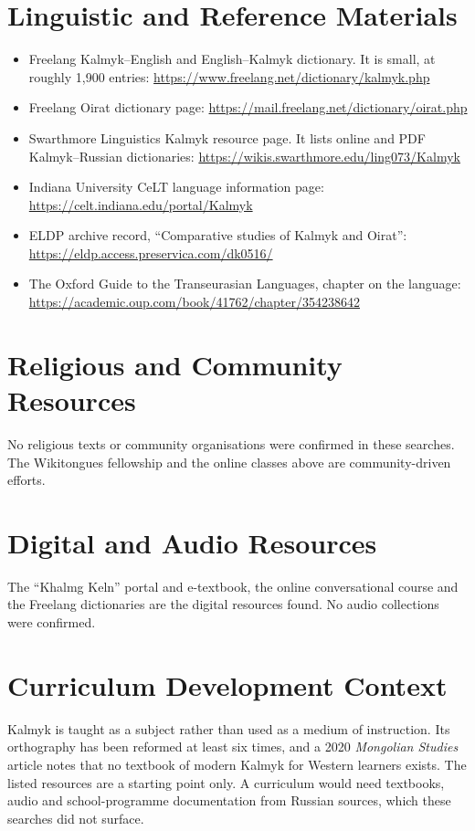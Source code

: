 \documentclass[12pt]{article}
\begin{document}
\section{Linguistic and Reference Materials}
\begin{itemize}
\item Freelang Kalmyk--English and English--Kalmyk dictionary. It is small, at roughly 1,900 entries: \url{https://www.freelang.net/dictionary/kalmyk.php}
\item Freelang Oirat dictionary page: \url{https://mail.freelang.net/dictionary/oirat.php}
\item Swarthmore Linguistics Kalmyk resource page. It lists online and PDF Kalmyk--Russian dictionaries: \url{https://wikis.swarthmore.edu/ling073/Kalmyk}
\item Indiana University CeLT language information page: \url{https://celt.indiana.edu/portal/Kalmyk}
\item ELDP archive record, ``Comparative studies of Kalmyk and Oirat'': \url{https://eldp.access.preservica.com/dk0516/}
\item The Oxford Guide to the Transeurasian Languages, chapter on the language: \url{https://academic.oup.com/book/41762/chapter/354238642}
\end{itemize}

\section{Religious and Community Resources}
No religious texts or community organisations were confirmed in these searches. The Wikitongues fellowship and the online classes above are community-driven efforts.

\section{Digital and Audio Resources}
The ``Khalmg Keln'' portal and e-textbook, the online conversational course and the Freelang dictionaries are the digital resources found. No audio collections were confirmed.

\section{Curriculum Development Context}
Kalmyk is taught as a subject rather than used as a medium of instruction. Its orthography has been reformed at least six times, and a 2020 \emph{Mongolian Studies} article notes that no textbook of modern Kalmyk for Western learners exists. The listed resources are a starting point only. A curriculum would need textbooks, audio and school-programme documentation from Russian sources, which these searches did not surface.
\end{document}
